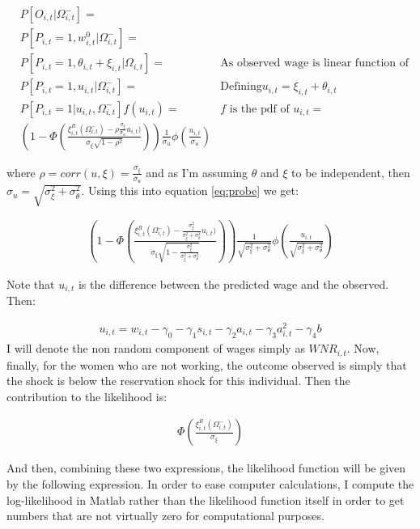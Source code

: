 \documentclass[11pt]{article}
\begin{document}
\begin{align}\label{eq:probe}
	& P[ O_{i,t}|\Omega_{i,t}^-]=\nonumber \\[0.2in]
	& P[ P_{i,t}=1,w_{i,t}^0|\Omega_{i,t}^-]= \nonumber \\[0.2in]
	& P[P_{i,t}=1,\theta_{i,t}+\xi_{i,t}|\Omega_{i,t}]= & \text{As observed wage is linear function of error terms} \nonumber \\[0.2in]
	& P[P_{i,t}=1,u_{i,t}|\Omega_{i,t}^-]= & \text{Defining} u_{i,t}=\xi_{i,t}+\theta_{i,t} \nonumber \\[0.2in]
	& P[P_{i,t}=1|u_{i,t},\Omega_{i,t}^-]f(u_{i,t}) =& f \text{ is the pdf of  } u_{i,t} =\nonumber \\[0.2in]
	& \left(1-\Phi\left( \frac{\xi_{i,t}^R(\Omega_{i,t}^-)-\rho \frac{\sigma_\xi}{\sigma_u}u_{i,t})}{\sigma_\xi\sqrt{1-\rho^2}}\right)  \right)\frac{1}{\sigma_u}\phi\left(\frac{u_{i,t}}{\sigma_u} \right)
\end{align}

where $\rho=corr(u,\xi)=\frac{\sigma_\xi}{\sigma_u}$ and as I'm assuming $\theta$ and $\xi$ to be independent, then $\sigma_u=\sqrt{\sigma_\xi^2+\sigma_\theta^2}$. Using this into equation \ref{eq:probe}  we get:

\begin{align}
	 \left(1-\Phi\left( \frac{\xi_{i,t}^R(\Omega_{i,t}^-)- \frac{\sigma_\xi^2}{\sigma_\xi^2+\sigma_\theta^2}u_{i,t})}{\sigma_\xi\sqrt{1-\frac{\sigma_\xi^2}{\sigma_\xi^2+\sigma_\theta^2}}}\right)  \right)\frac{1}{\sqrt{\sigma_\xi^2+\sigma_\theta^2}}\phi\left(\frac{u_{i,t}}{\sqrt{\sigma_\xi^2+\sigma_\theta^2}} \right)
\end{align}

Note that $u_{i,t}$ is the difference between the predicted wage and the observed. Then:

\begin{align}
	u_{i,t}=w_{i,t}-\gamma_0-\gamma_1s_{i,t}-\gamma_2a_{i,t}-\gamma_3a_{i,t}^2-\gamma_4b
\end{align}
I will denote the non random component of wages simply as $WNR_{i,t}$. Now, finally, for the women who are not working, the outcome observed is simply that the shock is below the reservation shock for this individual. Then the contribution to the likelihood is:

\begin{align}
	\Phi\left(\frac{ \xi_{i,t}^R(\Omega_{i,t}^-)}{\sigma_\xi} \right)
\end{align}


And then, combining these two expressions, the likelihood function will be given by the following expression. In order to ease computer calculations, I compute the log-likelihood in Matlab rather than the likelihood function itself in order to get numbers that are not virtually zero for computational purposes. 
\end{document}
